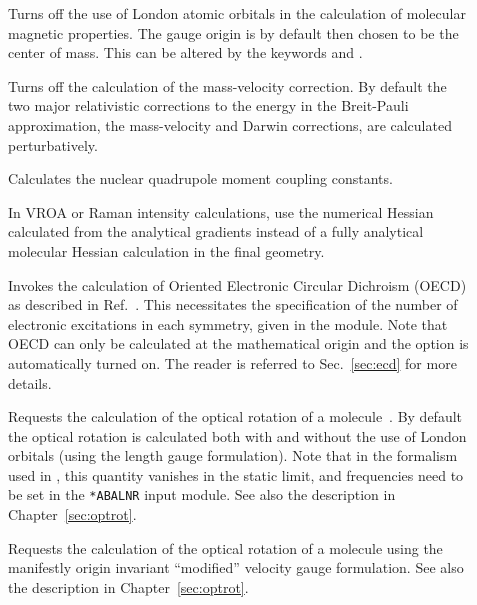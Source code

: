 \begin{description}
\item[] Turns off the use of London atomic
orbitals in
the calculation of molecular magnetic properties. The gauge origin is
by default then chosen to be the center of mass. This can be altered
by the keywords  and .

\item[] Turns off the calculation of the
mass-velocity
correction. By default the two major relativistic corrections to the
energy  in the Breit-Pauli approximation, the mass-velocity and Darwin
corrections, are calculated 
perturbatively.

\item[] Calculates the nuclear quadrupole moment
coupling constants. 

\item[] In VROA or Raman intensity calculations, use the
  numerical Hessian calculated from the analytical gradients instead
  of a fully analytical molecular Hessian calculation in the final
  geometry.

\item[] Invokes the calculation of Oriented Electronic Circular
Dichroism
(OECD)
as described in Ref.~\cite{tbpaehcpl246}. This 
necessitates the specification of the number of electronic
excitations in 
each symmetry, given in the  module.
Note that OECD can only be calculated at the mathematical origin
and the  option is automatically turned on.
The reader is
referred to Sec.~\ref{sec:ecd} for more details.

\item[] Requests the calculation of the optical rotation
of a molecule~\cite{thkrklbpjjofd99,plpmp91}. By default the optical
rotation is calculated 
both with and without the use of London orbitals (using the
length gauge formulation). Note that in the
formalism used in \siraba , this quantity vanishes in the static
limit, and frequencies need to be set in the \verb|*ABALNR| input
module. See also the description in Chapter~\ref{sec:optrot}.

\item[] Requests the calculation of the optical rotation
of a molecule using the manifestly origin invariant ``modified''
velocity gauge formulation\cite{Pedersen:ORMVE}.
See also the description in Chapter~\ref{sec:optrot}.


\end{description}
